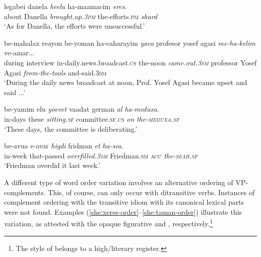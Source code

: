 \documentclass[output=paper]{langsci/langscibook}
\begin{document}
    \ea\label{she:xeres-v2}
        \gll legabei danela \textit{he{\ayin}elu} ha-ma{\alef}amacim \textit{{\het}eres}.\\
            about Danella \textit{brought.up.\textsc{3pm}} the-efforts.\textsc{pm} \textit{shard}\\
        \glt `As for Danella, the efforts were unsuccessful.'
    \z

    \ea\label{she:yaca-v2}
        \gll be-mahalax re{\alef}ayon be-yoman ha-caharayim \textit{yaca} profesor yosef {\alef}agasi \textit{me-ha-kelim} ve-amar...\\
            during interview in-daily.news.broadcast.\textsc{cs} the-noon \textit{came.out.\textsc{3sm}} professor Yosef Agasi \textit{from-the-tools} and-said.\textsc{3sm} \\
        \glt `During the daily news broadcast at noon, Prof. Yosef Agasi became upset and said ...'
    \z

    \ea\label{she:meduxa-v2}
        \gll be-yamim {\alef}elu \textit{yo{\shin}evet} va{\ayin}adat german \textit{{\ayin}al} \textit{ha-meduxa}.\\
            in-days these \textit{sitting.\textsc{sf}} committee.\textsc{sf}.\textsc{cs}  \textit{on} \textit{the-\textsc{meduxa}.\textsc{sf}}\\
        \glt `These days, the  committee is deliberating.'
    \z

    \ea\label{she:sea-v2}
        \gll be-{\shin}avu{\ayin}a {\shin}e-{\ayin}avar \textit{higdi{\shin}} fridman \textit{{\alef}et} \textit{ha-se{\alef}a}.\\
            in-week that-passed \textit{overfilled.\textsc{3sm}} Friedman.\textsc{sm} \textsc{acc} \textit{the-\textsc{seah}.\textsc{sf}}\\
        \glt `Friedman overdid it last week.'
    \z

A different type of word order variation involves an alternative ordering of VP-complements. This, of course, can only occur with ditransitive verbs. Instances of complement ordering with the transitive idiom  with its canonical lexical parts were not found. Examples (\ref{she:xeres-order}--\ref{she:taman-order}) illustrate this variation, as attested with the opaque figurative   and , respectively.\footnote{The style of  belongs to a high/literary register.}
\end{document}
